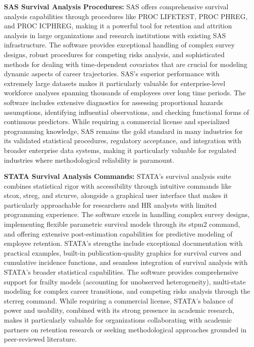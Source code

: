\documentclass[./main.tex]{subfiles}
\begin{document}
\textbf{SAS Survival Analysis Procedures:} SAS offers comprehensive
survival analysis capabilities through procedures like PROC LIFETEST,
PROC PHREG, and PROC ICPHREG, making it a powerful tool for retention
and attrition analysis in large organizations and research institutions
with existing SAS infrastructure. The software provides exceptional
handling of complex survey designs, robust procedures for competing
risks analysis, and sophisticated methods for dealing with
time-dependent covariates that are crucial for modeling dynamic aspects
of career trajectories. SAS's superior performance with extremely large
datasets makes it particularly valuable for enterprise-level workforce
analyses spanning thousands of employees over long time periods. The
software includes extensive diagnostics for assessing proportional
hazards assumptions, identifying influential observations, and checking
functional forms of continuous predictors. While requiring a commercial
license and specialized programming knowledge, SAS remains the gold
standard in many industries for its validated statistical procedures,
regulatory acceptance, and integration with broader enterprise data
systems, making it particularly valuable for regulated industries where
methodological reliability is paramount.

\textbf{STATA Survival Analysis Commands:} STATA's survival analysis
suite combines statistical rigor with accessibility through intuitive
commands like stcox, streg, and stcurve, alongside a graphical user
interface that makes it particularly approachable for researchers and HR
analysts with limited programming experience. The software excels in
handling complex survey designs, implementing flexible parametric
survival models through its stpm2 command, and offering extensive
post-estimation capabilities for predictive modeling of employee
retention. STATA's strengths include exceptional documentation with
practical examples, built-in publication-quality graphics for survival
curves and cumulative incidence functions, and seamless integration of
survival analysis with STATA's broader statistical capabilities. The
software provides comprehensive support for frailty models (accounting
for unobserved heterogeneity), multi-state modeling for complex career
transitions, and competing risks analysis through the stcrreg command.
While requiring a commercial license, STATA's balance of power and
usability, combined with its strong presence in academic research, makes
it particularly valuable for organizations collaborating with academic
partners on retention research or seeking methodological approaches
grounded in peer-reviewed literature.
\end{document}
